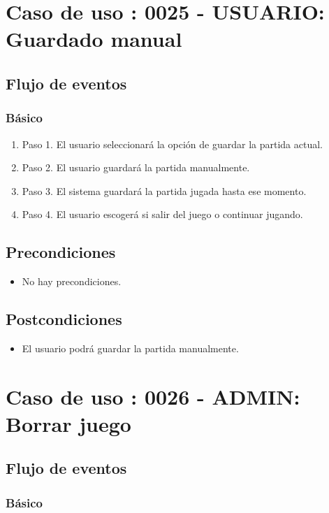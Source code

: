 \section{Caso de uso : 0025 - USUARIO: Guardado manual}\label{sec:uc0}
\subsection{Flujo de eventos}
\subsubsection{Básico}

\begin{enumerate}
\item Paso 1.
El usuario seleccionará la opción de guardar la partida actual.
\item Paso 2.
El usuario guardará la partida manualmente.  
\item Paso 3.
El sistema guardará la partida jugada hasta ese momento. 
\item Paso 4.
El usuario escogerá si salir del juego o continuar jugando. 
\end{enumerate}

\subsection{Precondiciones}
\begin{itemize}
\item No hay precondiciones.
\end{itemize}

\subsection{Postcondiciones}
\begin{itemize}
\item El usuario podrá guardar la partida manualmente. 
\end{itemize}



\section{Caso de uso : 0026 - ADMIN: Borrar juego}\label{sec:uc0}
\subsection{Flujo de eventos}
\subsubsection{Básico}

